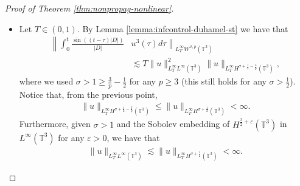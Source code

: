 \documentclass[a4paper, reqno, 11pt]{amsart}
\theoremstyle{definition}
\begin{document}
\begin{proof}[Proof of Theorem \ref{thm:nonpropag-nonlinear}]
\begin{itemize}
	\item Let $T \in (0,1)$. By Lemma \ref{lemma:infcontrol-duhamel-st} we have that
	\begin{align}\label{eq:mainproof-1}
	\left\| \int_0^t \frac{\sin((t-\tau)|D|)}{|D|} \right. & \left. u^3(\tau) d\tau \right\|_{L^{\infty}_T W^{\sigma,p}(\mathbb{T}^3)} \nonumber \\
	&\lesssim T  \| u \|_{L^{\infty}_TL^{\infty}(\mathbb{T}^3)}^2 \|u\|_{L^{\infty}_T H^{\sigma  + \frac{1}{2} - \frac{3}{p}}(\mathbb{T}^3)},
	\end{align}
	where we used $\sigma > 1 \geq \frac{3}{p} - \frac{1}{2}$ for any $p \geq 3$ (this still holds for any $\sigma > \frac{1}{2}$). Notice that, from the previous point,
	\begin{align*}
	\|u\|_{L^{\infty}_T H^{\sigma  + \frac{1}{2} - \frac{3}{p}}(\mathbb{T}^3)} \leq \|u\|_{L^{\infty}_T H^{\sigma  + \frac{1}{2}}(\mathbb{T}^3)} < \infty.
	\end{align*}			
	Furthermore, given $\sigma > 1$ and the Sobolev embedding of $H^{\frac{3}{2} + \varepsilon}(\mathbb{T}^3)$ in $L^{\infty}(\mathbb{T}^3)$ for any $\varepsilon > 0$, we have that
	\begin{align*}
	\| u \|_{L^{\infty}_TL^{\infty}(\mathbb{T}^3)} \lesssim \| u \|_{L^{\infty}_T H^{\sigma + \frac{1}{2}}(\mathbb{T}^3)} < \infty.
	\end{align*}
	\end{itemize}
	\end{proof}
	
\end{document}
